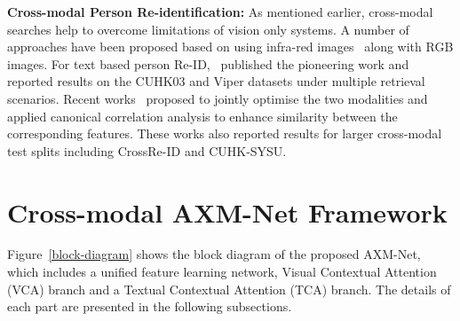 \documentclass[10pt,twocolumn,letterpaper]{article}
\begin{document}
\noindent\textbf{Cross-modal Person Re-identification:} As mentioned earlier, cross-modal searches help to overcome limitations of vision only systems. A number of approaches have been proposed based on using infra-red images~\cite{Wang_2019_ICCV,Lu_2020_CVPR,9107428} along with RGB images. For text based person Re-ID,~\cite{yan2018person} published the pioneering work and reported results on the CUHK03 and Viper datasets under multiple retrieval scenarios. Recent works~\cite{farooq2020convolutional,farooq2020IJCB} proposed to jointly optimise the two modalities and applied canonical correlation analysis to enhance similarity between the corresponding features. These works also reported results for larger cross-modal test splits including CrossRe-ID and CUHK-SYSU.



\section{Cross-modal AXM-Net Framework}
Figure~\ref{block-diagram} shows the block diagram of the proposed AXM-Net, which includes a unified feature learning network, Visual Contextual Attention (VCA) branch and a Textual Contextual Attention (TCA) branch. The details of each part are presented in the following subsections.
\end{document}
